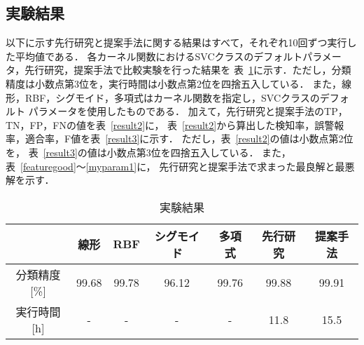 \subsection{実験結果}
以下に示す先行研究と提案手法に関する結果はすべて，それぞれ10回ずつ実行した平均値である．
各カーネル関数におけるSVCクラスのデフォルトパラメータ，先行研究，提案手法で比較実験を行った結果を
表~\ref{result1}に示す．ただし，分類精度は小数点第3位を，実行時間は小数点第2位を四捨五入している．
また，線形，RBF，シグモイド，多項式はカーネル関数を指定し，SVCクラスのデフォルト
パラメータを使用したものである．
加えて，先行研究と提案手法のTP，TN，FP，FNの値を表~\ref{result2}に，
表~\ref{result2}から算出した検知率，誤警報率，適合率，F値を表~\ref{result3}に示す．
ただし，表~\ref{result2}の値は小数点第2位を，
表~\ref{result3}の値は小数点第3位を四捨五入している．
また，表~\ref{featuregood}〜\ref{myparam1}に，
先行研究と提案手法で求まった最良解と最悪解を示す．
\begin{table}[b]
    \centering
    \caption{実験結果}  %
    \begin{tabular}{|c|c|c|c|c|c|c|}  %
        \hline  %
        ~ & 線形 &RBF &シグモイド&多項式&先行研究 & 提案手法\\  %
        \hline  %
        分類精度[\%]& 99.68&99.78&96.12&99.76&99.88& 99.91\\  %
        \hline  %
        実行時間[h] & - & -&-&-&11.8& 15.5\\  %
        \hline  %
    \end{tabular}
    \label{result1}  %
  \end{table}
